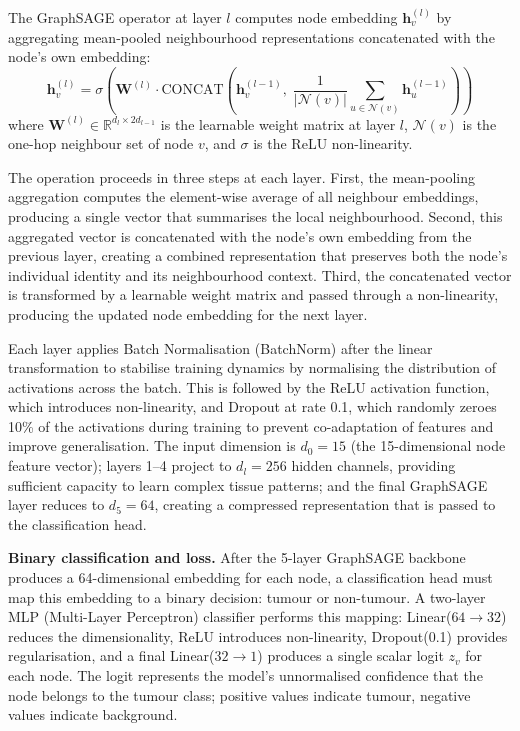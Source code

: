 \documentclass{article}
\begin{document}
The GraphSAGE operator \cite{hamilton2017graphsage} at layer $l$ computes node
embedding $\mathbf{h}_v^{(l)}$ by aggregating mean-pooled neighbourhood
representations concatenated with the node's own embedding:
\[
    \mathbf{h}_v^{(l)} = \sigma\!\left(
        \mathbf{W}^{(l)} \cdot \mathrm{CONCAT}\!\left(
            \mathbf{h}_v^{(l-1)},\;
            \frac{1}{|\mathcal{N}(v)|}
            \sum_{u \in \mathcal{N}(v)} \mathbf{h}_u^{(l-1)}
        \right)
    \right)
\]
where $\mathbf{W}^{(l)} \in \mathbb{R}^{d_l \times 2d_{l-1}}$ is the learnable
weight matrix at layer $l$, $\mathcal{N}(v)$ is the one-hop neighbour set of node
$v$, and $\sigma$ is the ReLU non-linearity.

The operation proceeds in three steps at each layer. First, the mean-pooling
aggregation computes the element-wise average of all neighbour embeddings, producing
a single vector that summarises the local neighbourhood. Second, this aggregated
vector is concatenated with the node's own embedding from the previous layer,
creating a combined representation that preserves both the node's individual
identity and its neighbourhood context. Third, the concatenated vector is
transformed by a learnable weight matrix and passed through a non-linearity,
producing the updated node embedding for the next layer.

Each layer applies Batch Normalisation (BatchNorm) after the linear transformation
to stabilise training dynamics by normalising the distribution of activations across
the batch. This is followed by the ReLU activation function, which introduces
non-linearity, and Dropout at rate 0.1, which randomly zeroes 10\% of the
activations during training to prevent co-adaptation of features and improve
generalisation. The input dimension is $d_0 = 15$ (the 15-dimensional node feature
vector); layers 1--4 project to $d_l = 256$ hidden channels, providing sufficient
capacity to learn complex tissue patterns; and the final GraphSAGE layer reduces to
$d_5 = 64$, creating a compressed representation that is passed to the classification
head.

\textbf{Binary classification and loss.}
After the 5-layer GraphSAGE backbone produces a 64-dimensional embedding for each
node, a classification head must map this embedding to a binary decision: tumour or
non-tumour. A two-layer MLP (Multi-Layer Perceptron) classifier performs this
mapping: Linear($64 \to 32$) reduces the dimensionality, ReLU introduces
non-linearity, Dropout(0.1) provides regularisation, and a final
Linear($32 \to 1$) produces a single scalar logit $z_v$ for each node. The logit
represents the model's unnormalised confidence that the node belongs to the tumour
class; positive values indicate tumour, negative values indicate background.
\end{document}
